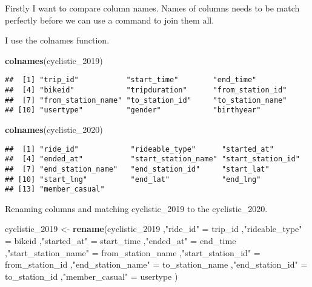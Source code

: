 \documentclass[
]{article}
\newenvironment{Shaded}{\begin{snugshade}}{\end{snugshade}}
\newcommand{\FunctionTok}[1]{\textcolor[rgb]{0.13,0.29,0.53}{\textbf{#1}}}
\newcommand{\NormalTok}[1]{#1}
\newcommand{\OtherTok}[1]{\textcolor[rgb]{0.56,0.35,0.01}{#1}}
\newcommand{\StringTok}[1]{\textcolor[rgb]{0.31,0.60,0.02}{#1}}
\begin{document}
Firstly I want to compare column names. Names of columns needs to be
match perfectly before we can use a command to join them all.

I use the colnames function.

\begin{Shaded}
\begin{Highlighting}[]
\FunctionTok{colnames}\NormalTok{(cyclistic\_2019)}
\end{Highlighting}
\end{Shaded}

\begin{verbatim}
##  [1] "trip_id"           "start_time"        "end_time"         
##  [4] "bikeid"            "tripduration"      "from_station_id"  
##  [7] "from_station_name" "to_station_id"     "to_station_name"  
## [10] "usertype"          "gender"            "birthyear"
\end{verbatim}

\begin{Shaded}
\begin{Highlighting}[]
\FunctionTok{colnames}\NormalTok{(cyclistic\_2020)}
\end{Highlighting}
\end{Shaded}

\begin{verbatim}
##  [1] "ride_id"            "rideable_type"      "started_at"        
##  [4] "ended_at"           "start_station_name" "start_station_id"  
##  [7] "end_station_name"   "end_station_id"     "start_lat"         
## [10] "start_lng"          "end_lat"            "end_lng"           
## [13] "member_casual"
\end{verbatim}

Renaming columns and matching cyclistic\_2019 to the cyclistic\_2020.

\begin{Shaded}
\begin{Highlighting}[]
\NormalTok{cyclistic\_2019 }\OtherTok{\textless{}{-}} \FunctionTok{rename}\NormalTok{(cyclistic\_2019}
\NormalTok{                         ,}\StringTok{"ride\_id"} \OtherTok{=}\NormalTok{ trip\_id}
\NormalTok{                         ,}\StringTok{"rideable\_type"} \OtherTok{=}\NormalTok{ bikeid}
\NormalTok{                         ,}\StringTok{"started\_at"} \OtherTok{=}\NormalTok{ start\_time}
\NormalTok{                         ,}\StringTok{"ended\_at"} \OtherTok{=}\NormalTok{ end\_time}
\NormalTok{                         ,}\StringTok{"start\_station\_name"} \OtherTok{=}\NormalTok{ from\_station\_name}
\NormalTok{                         ,}\StringTok{"start\_station\_id"} \OtherTok{=}\NormalTok{ from\_station\_id}
\NormalTok{                         ,}\StringTok{"end\_station\_name"} \OtherTok{=}\NormalTok{ to\_station\_name}
\NormalTok{                         ,}\StringTok{"end\_station\_id"} \OtherTok{=}\NormalTok{ to\_station\_id}
\NormalTok{                         ,}\StringTok{"member\_casual"} \OtherTok{=}\NormalTok{ usertype}
\NormalTok{                         )}
\end{Highlighting}
\end{Shaded}
\end{document}
